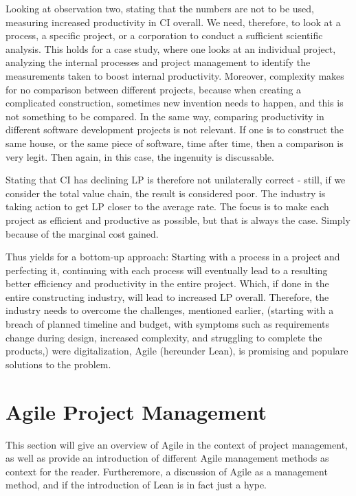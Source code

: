 Looking at observation two, stating that the numbers are not to be used, measuring increased productivity in CI overall. We need, therefore, to look at a process, a specific project, or a corporation to conduct a sufficient scientific analysis. This holds for a case study, where one looks at an individual project, analyzing the internal processes and project management to identify the measurements taken to boost internal productivity. Moreover, complexity makes for no comparison between different projects, because when creating a complicated construction, sometimes new invention needs to happen, and this is not something to be compared. In the same way, comparing productivity in different software development projects is not relevant. If one is to construct the same house, or the same piece of software, time after time, then a comparison is very legit. Then again, in this case, the ingenuity is discussable.

Stating that CI has declining LP is therefore not unilaterally correct - still, if we consider the total value chain, the result is considered poor. The industry is taking action to get LP closer to the average rate. The focus is to make each project as efficient and productive as possible, but that is always the case. Simply because of the marginal cost gained.

Thus yields for a bottom-up approach: Starting with a process in a project and perfecting it, continuing with each process will eventually lead to a resulting better efficiency and productivity in the entire project.  Which, if done in the entire constructing industry, will lead to increased LP overall. Therefore, the industry needs to overcome the challenges, mentioned earlier, (starting with a breach of planned timeline and budget, with symptoms such as requirements change during design, increased complexity, and struggling to complete the products,) were digitalization, Agile (hereunder Lean), is promising and populare solutions to the problem. 

\section{Agile Project Management}
This section will give an overview of Agile in the context of project management, as well as provide an introduction of different Agile management methods as context for the reader. Furtheremore, a discussion of Agile as a management method, and if the introduction of Lean is in fact just a hype. 

